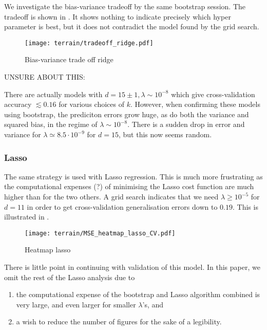         We investigate the bias-variance tradeoff by the same bootstrap session. The tradeoff is shown in . It shows nothing to indicate precisely which hyper parameter is best, but it does not contradict the model found by the grid search.

        \begin{figure}
            \texttt{[image: terrain/tradeoff\_ridge.pdf]}
            \caption{Bias-variance trade off ridge}
            \label{fig:gc_bias_variance_ridge}
        \end{figure}

        \par
        UNSURE ABOUT THIS:

        There are actually models with $d=15\pm 1, \lambda\sim  10^{-8}$ which give cross-validation accuracy $\lesssim 0.16$ for various choices of $k$. However, when confirming these models using bootstrap, the prediciton errors grow huge, as do both the variance and squared bias, in the regime of $\lambda\sim 10^{-8}$. There is a sudden drop in error and variance for $\lambda \simeq 8.5 \cdot 10^{-9}$ for $d=15$, but this now seems random.


        \subsubsection{Lasso}\label{sec:gc_lassoanalysis}

        The same strategy is used with Lasso regression. This is much more frustrating as the computational expenses (?) of minimising the Lasso cost function are much higher than for the two others. A grid search indicates that we need $\lambda \geq 10^{-5}$ for $d=11$ in order to get cross-validation generalisation errors down to $0.19$. This is illustrated in .

        \begin{figure}
            \texttt{[image: terrain/MSE\_heatmap\_lasso\_CV.pdf]}
            \caption{Heatmap lasso}
            \label{fig:gc_gridsearch_lasso}
        \end{figure}

        There is little point in continuing with validation of this model. In this paper, we omit the rest of the Lasso analysis due to 

        \begin{enumerate}[label=(\roman*)]
            \item the computational expense of the bootstrap and Lasso algorithm combined is very large, and even larger for smaller $\lambda$'s, and
            \item a wish to reduce the number of figures for the sake of a legibility.
        \end{enumerate}

      





    